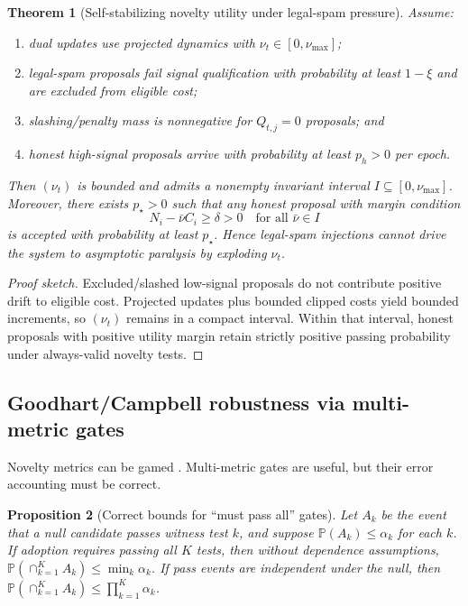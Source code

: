 \documentclass[11pt,a4paper]{article}
\newtheorem{theorem}{Theorem}[section]
\newtheorem{proposition}[theorem]{Proposition}
\begin{document}
\begin{theorem}[Self-stabilizing novelty utility under legal-spam pressure]
\label{thm:novelty-stable}
Assume:
\begin{enumerate}[leftmargin=*]
\item dual updates use projected dynamics with $\nu_t\in[0,\nu_{\max}]$;
\item legal-spam proposals fail signal qualification with probability at least $1-\xi$ and are excluded from eligible cost;
\item slashing/penalty mass is nonnegative for $Q_{t,j}=0$ proposals; and
\item honest high-signal proposals arrive with probability at least $p_h>0$ per epoch.
\end{enumerate}
Then $(\nu_t)$ is bounded and admits a nonempty invariant interval $I\subseteq[0,\nu_{\max}]$.
Moreover, there exists $p_\star>0$ such that any honest proposal with margin condition
\[
N_i-\bar\nu C_i \ge \delta>0\quad\text{for all }\bar\nu\in I
\]
is accepted with probability at least $p_\star$.
Hence legal-spam injections cannot drive the system to asymptotic paralysis by exploding $\nu_t$.
\end{theorem}
\begin{proof}[Proof sketch]
Excluded/slashed low-signal proposals do not contribute positive drift to eligible cost.
Projected updates plus bounded clipped costs yield bounded increments, so $(\nu_t)$ remains in a compact interval.
Within that interval, honest proposals with positive utility margin retain strictly positive passing probability under always-valid novelty tests.
\end{proof}

\subsection{Goodhart/Campbell robustness via multi-metric gates}
Novelty metrics can be gamed \citep{Goodhart1975,Campbell1976}.
Multi-metric gates are useful, but their error accounting must be correct.

\begin{proposition}[Correct bounds for ``must pass all'' gates]
Let $A_k$ be the event that a null candidate passes witness test $k$, and suppose $\mathbb{P}(A_k)\le \alpha_k$ for each $k$.
If adoption requires passing \emph{all} $K$ tests, then without dependence assumptions,
$\mathbb{P}(\cap_{k=1}^K A_k)\le \min_k \alpha_k$.
If pass events are independent under the null, then
$\mathbb{P}(\cap_{k=1}^K A_k)\le \prod_{k=1}^K \alpha_k$.
\end{proposition}
\end{document}
